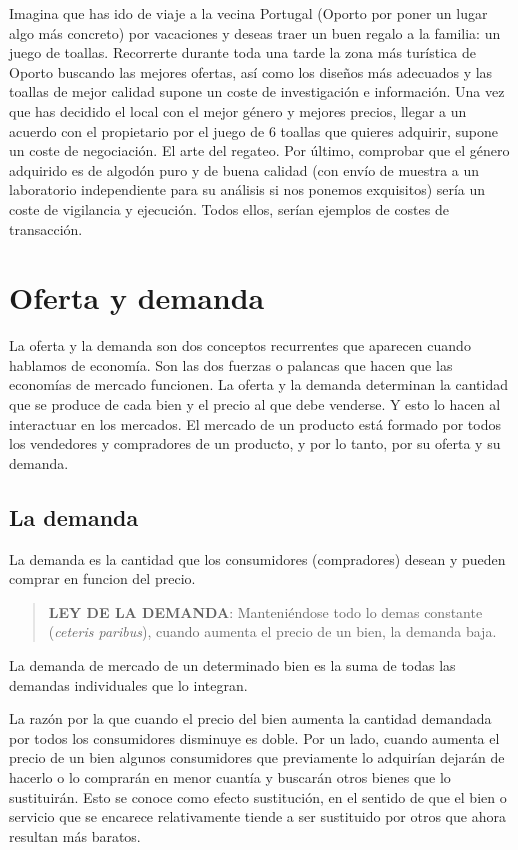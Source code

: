 \documentclass[
]{krantz}
\begin{document}
Imagina que has ido de viaje a la vecina Portugal (Oporto por poner un lugar algo más concreto) por vacaciones y deseas traer un buen regalo a la familia: un juego de toallas. Recorrerte durante toda una tarde la zona más turística de Oporto buscando las mejores ofertas, así como los diseños más adecuados y las toallas de mejor calidad supone un coste de investigación e información. Una vez que has decidido el local con el mejor género y mejores precios, llegar a un acuerdo con el propietario por el juego de 6 toallas que quieres adquirir, supone un coste de negociación. El arte del regateo. Por último, comprobar que el género adquirido es de algodón puro y de buena calidad (con envío de muestra a un laboratorio independiente para su análisis si nos ponemos exquisitos) sería un coste de vigilancia y ejecución. Todos ellos, serían ejemplos de costes de transacción.

\hypertarget{oferta-y-demanda}{%
\chapter{Oferta y demanda}\label{oferta-y-demanda}}

La oferta y la demanda son dos conceptos recurrentes que aparecen cuando hablamos de economía. Son las dos fuerzas o palancas que hacen que las economías de mercado funcionen. La oferta y la demanda determinan la cantidad que se produce de cada bien y el precio al que debe venderse. Y esto lo hacen al interactuar en los mercados. El mercado de un producto está formado por todos los vendedores y compradores de un producto, y por lo tanto, por su oferta y su demanda.

\hypertarget{la-demanda}{%
\section{La demanda}\label{la-demanda}}

La demanda es la cantidad que los consumidores (compradores) desean y pueden comprar en funcion del precio.

\begin{quote}
\textbf{LEY DE LA DEMANDA}:
Manteniéndose todo lo demas constante (\emph{ceteris paribus}), cuando aumenta el precio de un bien, la demanda baja.
\end{quote}

La demanda de mercado de un determinado bien es la suma de todas las demandas individuales que lo integran.

La razón por la que cuando el precio del bien aumenta la cantidad demandada por todos los consumidores disminuye es doble. Por un lado, cuando aumenta el precio de un bien algunos consumidores que previamente lo adquirían dejarán de hacerlo o lo comprarán en menor cuantía y buscarán otros bienes que lo sustituirán. Esto se conoce como efecto sustitución, en el sentido de que el bien o servicio que se encarece relativamente tiende a ser sustituido por otros que ahora resultan más baratos.
\end{document}
